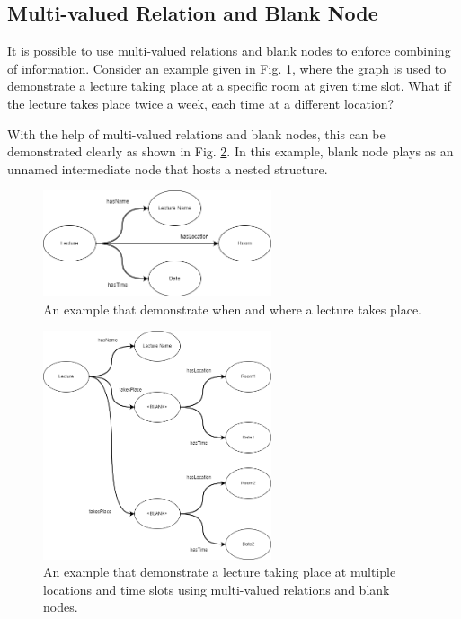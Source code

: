 \subsection{Multi-valued Relation and Blank Node}

It is possible to use multi-valued relations and blank nodes to enforce combining of information. Consider an example given in Fig. \ref{fig:lectureexp}, where the graph is used to demonstrate a lecture taking place at a specific room at given time slot. What if the lecture takes place twice a week, each time at a different location? 

With the help of multi-valued relations and blank nodes, this can be demonstrated clearly as shown in Fig. \ref{fig:lectureexp2}. In this example, blank node plays as an unnamed intermediate node that hosts a nested structure.
\begin{figure}[!htb]
	\centering
	\includegraphics[width=0.6\textwidth]{chapters/part-4/figures/lectureexp.png}
	\caption{An example that demonstrate when and where a lecture takes place.}
	\label{fig:lectureexp}
\end{figure}

\begin{figure}[!htb]
	\centering
	\includegraphics[width=0.6\textwidth]{chapters/part-4/figures/lectureexp2.png}
	\caption{An example that demonstrate a lecture taking place at multiple locations and time slots using multi-valued relations and blank nodes.}
	\label{fig:lectureexp2}
\end{figure}

